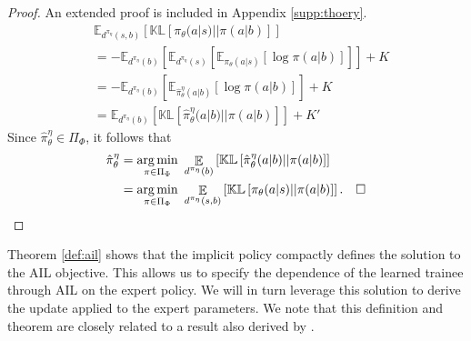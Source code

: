 \begin{proof}\renewcommand{\qedsymbol}{}
An extended proof is included in Appendix \ref{supp:thoery}.
\begin{align*}
    &\mathbb{E}_{d^{\pi_{\eta}}(s,b)}  \left[ \mathbb{KL} \left[ \pi_{\theta}(a|s) || \pi(a|b) \right] \right] \\
    &= -\mathbb{E}_{d^{\pi_{\eta}}(b)}  \left[ \mathbb{E}_{d^{\pi_{\eta}}(s)}  \left[ \mathbb{E}_{\pi_{\theta}(a|s)} \left[ \log \pi(a|b) \right] \right] \right] + K \\
    &= -\mathbb{E}_{d^{\pi_{\eta}}(b)}  \left[ \mathbb{E}_{\hat{\pi}_{\theta}^{\eta}(a|b)} \left[ \log \pi(a|b) \right] \right] + K \\
    &=
    \mathbb{E}_{d^{\pi_{\eta}}(b)}  \left[ \mathbb{KL} \left[ \hat{\pi}_{\theta}^{\eta}(a|b) || \pi(a|b) \right] \right] + K' 
\end{align*}
Since $\hat{\pi}_{\theta}^{\eta} \in \Pi_{\Phi}$, it follows that
\begin{align}
\hat{\pi}_{\theta}^{\eta} &=
\mathop{\argmin}_{\pi \in \Pi_{\Phi}}\ \mathop{\mathbb{E}}_{d^{\pi_{\eta}}(b)}  \left[ \mathbb{KL} \left[ \hat{\pi}_{\theta}^{\eta}(a | b) || \pi (a | b) \right] \right] \label{eq:variational} \\
&=
\mathop{\argmin}_{\pi \in \Pi_{\Phi}}\ \mathop{\mathbb{E}}_{d^{\pi_{\eta}}(s,b)}  \left[ \mathbb{KL} \left[ \pi_{\theta}(a|s) || \pi(a|b) \right] \right]. \quad \square 
\end{align}
\end{proof}
Theorem \ref{def:ail} shows that the implicit policy compactly defines the solution to the AIL objective.  This allows us to specify the dependence of the learned trainee through AIL on the expert policy.  We will in turn leverage this solution to derive the update applied to the expert parameters.  We note that this definition and theorem are closely related to a result also derived by \citet{weihs2020bridging}.  

